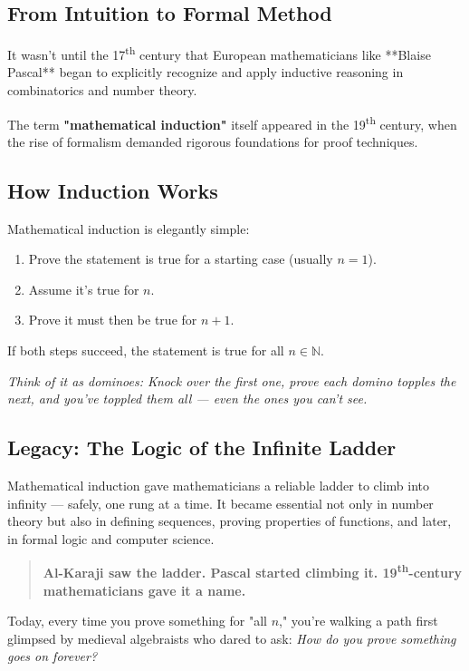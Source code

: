 \begin{tcolorbox}[colback=blue!5!white, colframe=blue!50!black, title={Historical Sidebar: Mathematical Induction — Proving Forever, One Step at a Time}, breakable]
    \subsection*{From Intuition to Formal Method}
    
    It wasn’t until the 17\textsuperscript{th} century that European mathematicians like **Blaise Pascal** began to explicitly recognize and apply inductive reasoning in combinatorics and number theory.
    
    The term \textbf{"mathematical induction"} itself appeared in the 19\textsuperscript{th} century, when the rise of formalism demanded rigorous foundations for proof techniques.
    
    \subsection*{How Induction Works}
    
    Mathematical induction is elegantly simple:
    
    \begin{enumerate}
      \item Prove the statement is true for a starting case (usually \( n = 1 \)).
      \item Assume it’s true for \( n \).
      \item Prove it must then be true for \( n + 1 \).
    \end{enumerate}
    
    If both steps succeed, the statement is true for all \( n \in \mathbb{N} \).
    
    \begin{center}
    \textit{Think of it as dominoes:  
    Knock over the first one,  
    prove each domino topples the next,  
    and you've toppled them all — even the ones you can’t see.}
    \end{center}
    
    \subsection*{Legacy: The Logic of the Infinite Ladder}
    
    Mathematical induction gave mathematicians a reliable ladder to climb into infinity — safely, one rung at a time. It became essential not only in number theory but also in defining sequences, proving properties of functions, and later, in formal logic and computer science.
    
    \begin{quote}
    \textbf{Al-Karaji saw the ladder.  
    Pascal started climbing it.  
    19\textsuperscript{th}-century mathematicians gave it a name.}
    \end{quote}
    
    Today, every time you prove something for "all \( n \)," you’re walking a path first glimpsed by medieval algebraists who dared to ask:  
    \textit{How do you prove something goes on forever?}
    
\end{tcolorbox}


